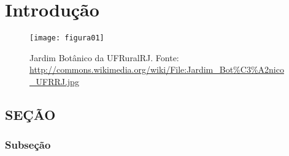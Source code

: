 \setcounter{page}{1}
\artigofalse
\chapter{Introdução}
\label{chap:introduction}

\blindtext[2]

\begin{figure}[!ht]
\centering
\texttt{[image: figura01]}
\caption{Jardim Botânico da UFRuralRJ. Fonte: \url{http://commons.wikimedia.org/wiki/File:Jardim_Bot\%C3\%A2nico_UFRRJ.jpg}}
\label{fig:jardim}
\end{figure}

\blindtext[1]

\section{SEÇÃO}

\blindtext[2]

\subsection{Subseção}

\blindtext[2]